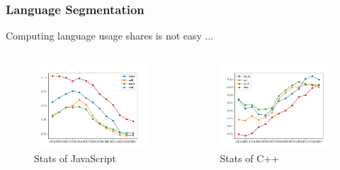 \documentclass[dvipsnames, 10pt, table]{beamer}
\begin{document}
\begin{frame}
  \frametitle{Language Segmentation}
  Computing language usage shares is not easy ...
  \begin{columns}
    \begin{column}{0.5\textwidth}
      \begin{figure}
        \begin{center}
          \includegraphics[width=1.0\textwidth]{figures/githut/JavaScript.png}
          \caption{Stats of JavaScript}
        \end{center}
      \end{figure}
    \end{column}
    \begin{column}{0.5\textwidth}
      \begin{figure}
        \begin{center}
          \includegraphics[width=1.0\textwidth]{figures/githut/C++.png}
          \caption{Stats of C++}
        \end{center}
      \end{figure}
    \end{column}
  \end{columns}
\end{frame}
\end{document}
